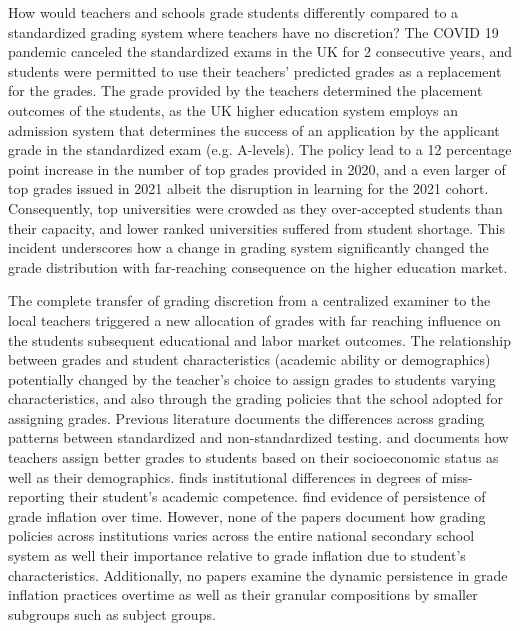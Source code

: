 
How would teachers and schools grade students differently compared to a standardized grading system where teachers have no discretion?  The COVID 19 pandemic canceled the standardized exams in the UK for 2 consecutive years, and students were permitted to use their teachers' predicted grades as a replacement for the grades. The grade provided by the teachers determined the placement outcomes of the students, as the UK higher education system employs an admission system that determines the success of an application by the applicant grade in the standardized exam (e.g. A-levels).  The policy lead to a 12 percentage point increase in the number of top grades provided in 2020, and a even larger of top grades issued in 2021 albeit the disruption in learning for the 2021 cohort. Consequently, top universities were crowded as they over-accepted students than their capacity, and lower ranked universities suffered from student shortage. This incident underscores how a change in grading system significantly changed the grade distribution with far-reaching consequence on the higher education market.

The complete transfer of grading discretion from a centralized examiner to the local teachers triggered a new allocation of grades with far reaching influence on the students subsequent educational and labor market outcomes. The relationship between grades and student characteristics (academic ability or demographics) potentially changed by the teacher's choice to assign grades to students varying characteristics, and also through the grading policies that the school adopted for assigning grades. Previous literature documents the differences across grading patterns between standardized and non-standardized testing. \cite{hanna2012} and \cite{lavy2018} documents how teachers assign better grades to students based on their socioeconomic status as well as their demographics. \cite{figlio2006}  finds institutional differences in degrees of miss-reporting their student's academic competence. \cite{10.1257/app.20200525} find evidence of persistence of grade inflation over time.  However, none of the papers document how grading policies across institutions varies across the entire national secondary school system as well their importance relative to grade inflation due to student's characteristics. Additionally, no papers examine the dynamic persistence in grade inflation practices overtime as well as their granular compositions by smaller subgroups such as subject groups. 

